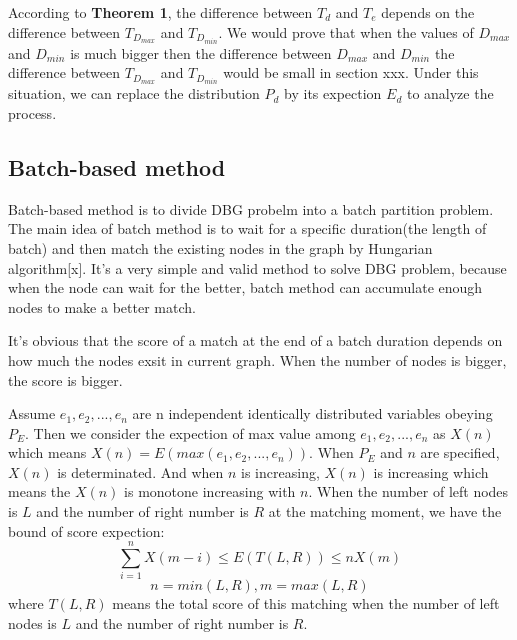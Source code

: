 \par According to \textbf{Theorem 1},   the difference between $T_d$ and $T_e$ depends on the difference between $T_{D_{max}}$ and $T_{D_{min}}$. We  would prove that when the values of   $D_{max}$ and $D_{min}$ is much bigger then  the difference between $D_{max}$ and $D_{min}$ the difference between $T_{D_{max}}$ and $T_{D_{min}}$ would be small in section xxx. Under this situation, we can replace the distribution $P_d$ by its expection  $E_d$ to analyze the process.

\subsection{Batch-based method}
\par Batch-based method is to divide DBG probelm into a batch partition problem. The main idea of batch method is to wait for a specific duration(the length of batch) and then match the existing nodes in the graph by Hungarian algorithm[x]. It's a very simple and valid method to solve DBG problem, because when the node can wait for the better, batch method can accumulate enough nodes to make a better match.
\par It's obvious that the score of  a match at the end of  a batch duration depends on how much the nodes exsit in current graph. When the number of nodes is bigger, the score is bigger. 
\begin{theorem}\label{the score of  a match}
Assume $e_1, e_2,..., e_n$ are n independent identically distributed variables obeying $P_E$. Then we consider the expection of max value among $e_1, e_2,..., e_n$ as $X(n)$ which means $X(n)=E(max(e_1, e_2,..., e_n))$. When $P_E$ and $n$ are specified, $X(n)$ is determinated. And when $n$ is increasing, $X(n)$  is increasing which means the $X(n)$ is monotone increasing with $n$. When the number of left nodes is $L$ and the number of right number is $R$ at the matching moment, we have the bound of score expection:
$$\sum_{i=1}^n{X(m-i)} \leq E(T(L,R))\leq nX(m)$$ 
$$n=min(L,R), m=max(L,R)$$
where $T(L,R)$ means the total score of this matching when  the number of left nodes is $L$ and the number of right number is $R$.
\end{theorem}
